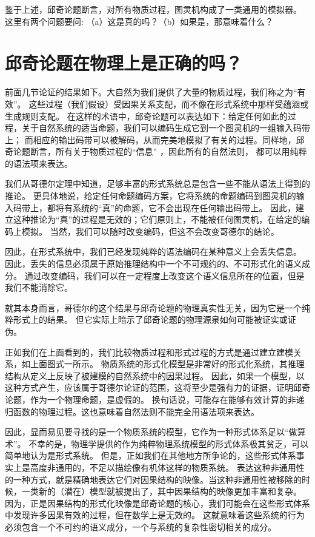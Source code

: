 \documentclass[a4paper,12pt]{article}
\begin{document}
鉴于上述，邱奇论题断言，对所有物质过程，图灵机构成了一类通用的模拟器。 这里有两个问题要问: （a）这是真的吗？（b）如果是，那意味着什么？

\section{邱奇论题在物理上是正确的吗？}

前面几节论证的结果如下。大自然为我们提供了大量的物质过程，我们称之为“有效”。
这些过程（我们假设）受因果关系支配，而不像在形式系统中那样受蕴涵或生成规则支配。
在这样的术语中，邱奇论题可以表达如下：给定任何如此的过程，关于自然系统的适当命题，我们可以编码生成它到一个图灵机的一组输入码带上；
而相应的输出码带可以被解码，从而完美地模拟了有关的过程。同样地，邱奇论题断言，所有关于物质过程的“信息” ，因此所有的自然法则，
都可以用纯粹的语法项来表达。

我们从哥德尔定理中知道，足够丰富的形式系统总是包含一些不能从语法上得到的推论。
更具体地说，给定任何命题编码方案，它将系统的命题编码到图灵机的输入码带上，都将有系统的“真”的命题，它不会出现在任何输出码带上。
因此，建立这种推论为“真”的过程是无效的；它们原则上，不能被任何图灵机，在给定的编码上模拟。
当然，我们可以随时改变编码，但这不会改变哥德尔的结论。

因此，在形式系统中，我们已经发现纯粹的语法编码在某种意义上会丢失信息。
因此，丢失的信息必须属于原始推理结构中一个不可规约的、不可形式化的语义成分。
通过改变编码，我们可以在一定程度上改变这个语义信息所在的位置，但是我们不能消除它。

就其本身而言，哥德尔的这个结果与邱奇论题的物理真实性无关，因为它是一个纯粹形式上的结果。
但它实际上暗示了邱奇论题的物理源泉如何可能被证实或证伪。

正如我们在上面看到的，我们比较物质过程和形式过程的方式是通过建立建模关系，如上面图式一所示。
物质系统的形式化模型是非常好的形式化系统，其推理结构从定义上反映了被建模的自然系统中的因果过程。
因此，如果一个模型，以这种方式产生，应该属于哥德尔论证的范围，这将至少是强有力的证据，证明邱奇论题，作为一个物理命题，是虚假的。
换句话说，可能存在能够有效计算的非递归函数的物理过程。这也意味着自然法则不能完全用语法项来表达。

因此，显而易见要寻找的是一个物质系统的模型，它作为一种形式体系足以“做算术”。
不幸的是，物理学提供的作为纯粹物理系统模型的形式体系极其贫乏，可以简单地认为是形式系统。
但是，正如我们在其他地方所争论的，这些形式体系事实上是高度非通用的，不足以描绘像有机体这样的物质系统\cite{RosenRinpress}。
表达这种非通用性的一种方式，就是精确地表达它们对因果结构的映像。当这种非通用性被移除的时候，一类新的（潜在）模型就被提出了，其中因果结构的映像更加丰富和复杂。
因为，正是因果结构的形式化映像是邱奇论题的核心，我们可能会在这些形式体系中发现许多因果有效的过程，但在数学上是无效的。
这就意味着这些系统的行为必须包含一个不可约的语义成分，一个与系统的复杂性密切相关的成分。
\end{document}
